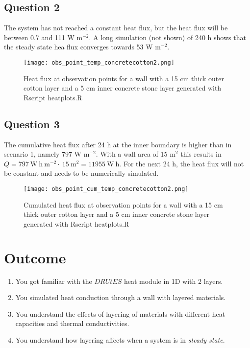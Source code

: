 \documentclass[
10pt, %
a4paper, %
oneside, %
headinclude,footinclude, %
BCOR5mm, %
]{scrartcl}
\begin{document}
\subsection*{Question 2}

The system has not reached a constant heat flux, but the heat flux will be between 0.7 and 111 W m$^{-2}$. A long simulation (not shown) of 240 h shows that the steady state hea flux converges towards 53 W m$^{-2}$.

\begin{figure}[!h]
\centering
\texttt{[image: obs\_point\_temp\_concretecotton2.png]}
\caption{\label{plot5} Heat flux at observation points for a wall with a 15 cm thick outer cotton layer and a 5 cm inner concrete stone layer generated with Rscript heatplots.R}
\end{figure}


\subsection*{Question 3}

The cumulative heat flux after 24 h at the inner boundary is higher than in scenario 1, namely 797 W m$^{-2}$. With a wall area of 15 m$^2$ this results in $Q = 797~\mathrm{W~h~m^{-2}}\cdot~15~\mathrm{m^{2}}= 11955 ~\mathrm{W~h}$. 
For the next 24 h, the heat flux will not be constant and needs to be numerically simulated. 

\begin{figure}[!h]
\centering
\texttt{[image: obs\_point\_cum\_temp\_concretecotton2.png]}
\caption{\label{plot6} Cumulated heat flux at observation points for a wall with a 15 cm thick outer cotton layer and a 5 cm inner concrete stone layer generated with Rscript heatplots.R}
\end{figure}

\newpage
\newpage
\newpage

\section{Outcome}
\begin{enumerate}
\item You got familiar with the $DRUtES$ heat module in 1D with 2 layers.
\item You simulated heat conduction through a wall with layered materials.
\item You understand the effects of layering of materials with different heat capacities and thermal conductivities.
\item You understand how layering affects when a system is in \emph{steady state}.
\end{enumerate}
\end{document}
